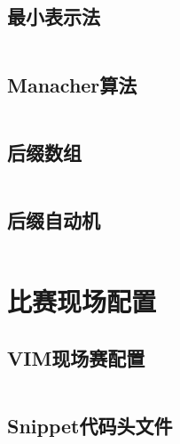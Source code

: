 \documentclass[a4paper,12pt]{article}
\begin{document}
\subsection{最小表示法}
\inputminted[breaklines, linenos]{c++}{string/minimal.cc}
\subsection{Manacher算法}
\inputminted[breaklines, linenos]{c++}{string/manacher.cc}
\subsection{后缀数组}
\inputminted[breaklines, linenos]{c++}{string/sa.cc}
\subsection{后缀自动机}
\inputminted[breaklines, linenos]{c++}{string/sam.cc}


\newpage
\section{比赛现场配置}
\subsection{VIM现场赛配置}
\inputminted[breaklines, linenos]{bash}{others/vim.bash}
\subsection{Snippet代码头文件}
\inputminted[breaklines, linenos]{c++}{others/head.cc}
\end{document}

